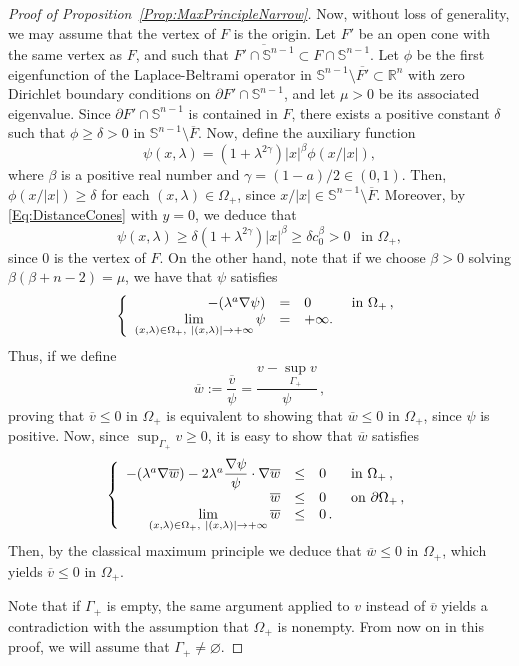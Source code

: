 \documentclass[twoside,leqno,symbols-for-thanks, draft]{rmi}
\numberwithin{equation}{section}
\theoremstyle{definition}
\newcommand{\con}[1]{\mathbb{#1}}
\newcommand{\R}{\con{R}} %
\newcommand{\Sph}{\con{S}} %
\newcommand{\s}{\gamma}
\newcommand\beqc[1]{\left\{\begin{array}{#1}}
\newcommand\eeqc{\end{array} \right.}
\def\PDEsystem{rcll}
\let\div\relax
\DeclareMathOperator{\div}{div}
\def\ds{\displaystyle}
\begin{document}
\begin{proof}[Proof of Proposition~\ref{Prop:MaxPrincipleNarrow}]
	Now, without loss of generality, we may assume that the vertex of $F$ is the origin. Let $F'$ be an open cone with the same vertex as $F$, and such that $\overline{F'\cap \Sph^{n-1}} \subset F\cap \Sph^{n-1}$. Let $\phi$ be the first eigenfunction of the Laplace-Beltrami operator in $\Sph^{n-1} \setminus \overline{F'}\subset \R^n$ with zero Dirichlet boundary conditions on $\partial F' \cap \Sph^{n-1}$, and let $\mu>0$ be its associated eigenvalue. Since $\partial F' \cap \Sph^{n-1}$ is contained in $F$, there exists a positive constant $\delta$ such that $\phi\geq \delta > 0$ in $\Sph^{n-1} \setminus \overline{F}$. Now, define the auxiliary function
	$$ 
	\psi(x,\lambda) = (1+\lambda^{2\s}) |x|^\beta \phi(x/|x|), 
	$$
	where $\beta$ is a positive real number and $\s = (1-a)/2 \in (0,1)$. Then, $\phi(x/|x|)\geq \delta$ for each $(x,\lambda) \in \Omega_+$,  since $x/|x| \in \Sph^{n-1} \setminus \overline{F}$. Moreover, by \eqref{Eq:DistanceCones} with $y=0$, we deduce that
	$$ 
	\psi(x,\lambda) \geq \delta (1+\lambda^{2\s}) |x|^\beta \geq \delta c_0^\beta > 0 \ \ \text{ in } \Omega_+,
	$$
	since $0$ is the vertex of $F$.
	On the other hand, note that if we choose $\beta>0$ solving $\beta(\beta+n-2)=\mu$, we have that $\psi$ satisfies
	$$
	\beqc{\PDEsystem}
	-\div(\lambda^a \nabla \psi) &=& 0 & \text{ in } \Omega_+\,, \\
	\ds \lim_{(x,\lambda)\in \Omega_+, \ |(x,\lambda)|\to +\infty} \psi & = & +\infty.
	\eeqc
	$$
	Thus, if we define 
	$$\overline{w}:=\dfrac{\overline{v} }{\psi} = \dfrac{v - \sup_{\Gamma_+} v}{\psi}\,,$$
	proving that $\overline{v} \leq 0$ in $\Omega_+$ is equivalent to showing that $\overline{w}\leq 0$ in $\Omega_+$, since $\psi$ is positive. Now, since $\sup_{\Gamma_+} v \geq 0$, it is easy to show that $\overline{w}$ satisfies
	\begin{equation}
	\label{Eq:wTildeEquationNarrow}
	\beqc{\PDEsystem}
	-\div(\lambda^a \nabla \overline{w})-2\lambda^a\dfrac{\nabla \psi}{\psi}\cdot\nabla \overline{w} &\leq& 0 & \text{ in } \Omega_+\,, \\
	\overline{w} &\leq& 0 & \text{ on } \partial \Omega_+\,, \\
	\ds \lim_{(x,\lambda)\in \Omega_+, \ |(x,\lambda)|\to +\infty} \overline{w} & \leq & 0\,.
	\eeqc
	\end{equation}
	Then, by the classical maximum principle we deduce that $\overline{w}\leq 0$ in $\Omega_+$, which yields $\overline{v}\leq 0$ in $\Omega_+$.
	
	Note that if $\Gamma_+$ is empty, the same argument applied to $v$ instead of $\overline{v}$ yields a contradiction with the assumption that $\Omega_+$ is nonempty. From now on in this proof, we will assume that $\Gamma_+ \neq \varnothing$.
	

\end{proof}
\end{document}
